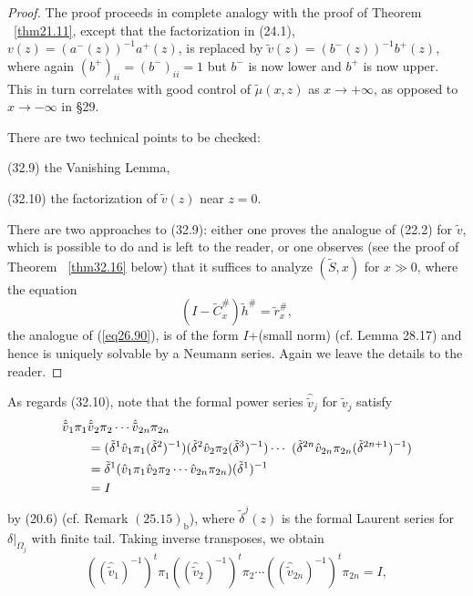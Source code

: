 \documentclass{surv-l}
\theoremstyle{plain}
\theoremstyle{definition}
\numberwithin{equation}{chapter}
\begin{document}
\begin{proof}
The proof proceeds in complete analogy with the proof of Theorem ~\ref{thm21.11}, except that the factorization in (24.1), $v(z)=(a^{-}(z))^{-1}a^{+}(z)$, is replaced by $\tilde{v}(z)=(b^{-}(z))^{-1}b^{+}(z)$, where again $(b^{+})_{ii}=(b^{-})_{ii}=1$ but $b^{-}$ is now lower and $b^{+}$ is now upper. This in turn correlates with good control of $\tilde{\mu}(x, z)$ as $ x\rightarrow+\infty$, as opposed to $x \rightarrow-\infty$ in \S 29.

There are two technical points to be checked:

(32.9) the Vanishing Lemma,

(32.10) the factorization of $\tilde{v}(z)$ near $z=0$.

There are two approaches to (32.9): either one proves the analogue of (22.2) for $\tilde{v}$, which is possible to do and is left to the reader, or one observes (see the proof of Theorem ~\ref{thm32.16} below) that it suffices to analyze $(\tilde{S}, x)$ for $x\gg 0$, where the equation
\setcounter{equation}{10}
\begin{equation}\label{eq32.11}
(I-\tilde{C}_{x}^{\#})\tilde{h}^{\#}=\tilde{r}_{x}^{\#},
\end{equation}
the analogue of (\ref{eq26.90}), is of the form $I$+(small norm) (cf. Lemma 28.17) and hence is uniquely solvable by a Neumann series. Again we leave the details to the reader.
\end{proof}
As regards (32.10), note that the formal power series ${\hat{\tilde{v}}}_{j}$ for $\tilde{v}_{j}$ satisfy
\begin{align}\label{eq32.12}
{\hat{\tilde{v}}}_{1}\pi_{1}&{\hat{\tilde{v}}}_{2}\pi_{2}\cdots {\hat{\tilde{v}}}_{2n}\pi_{2n}\\ \notag
&=(\tilde{\delta}^{1}\hat{v}_{1}\pi_{1}(\tilde{\delta}^{2})^{-1})(\tilde{\delta}^{2}\hat{v}_{2}\pi_{2}(\tilde{\delta}^{3})^{-1})\cdots\ (\tilde{\delta}^{2n}\hat{v}_{2n}\pi_{2n}(\tilde{\delta}^{2n+1})^{-1})\\ \notag
&=\tilde{\delta}^{1} (\hat{v}_{1}\pi_{1}\hat{v}_{2}\pi_{2}\cdots\hat{v}_{2n}\pi_{2n})(\tilde{\delta}^{1})^{-1}\\ \notag
&=I \notag
\end{align}
by (20.6) (cf. Remark $(25.15)_{\mathrm{b}}$), where $\tilde{\delta}^{j}(z)$ is the formal Laurent series for $\delta|_{\Omega_{j}}$ with finite tail. Taking inverse transposes, we obtain
\begin{equation}\label{eq32.13}
(({\hat{\tilde{v}}}_{1})^{-1})^{t}\pi_{1}(({\hat{\tilde{v}}}_{2})^{-1})^{t}\pi_{2}\cdots (({\hat{\tilde{v}}}_{2n})^{-1})^{t}\pi_{2n}=I,
\end{equation}
\end{document}
